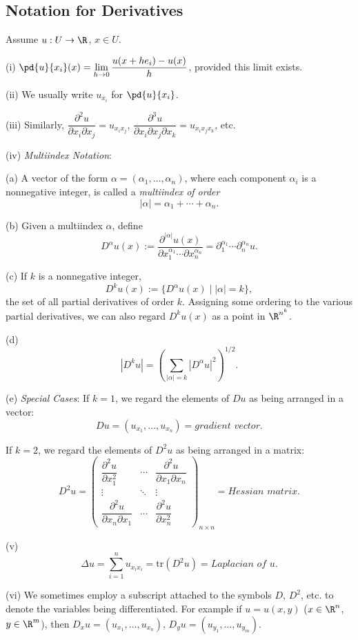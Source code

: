 \subsection{Notation for Derivatives}
\label{sec:notation-for-derivatives}

\begin{definition}
\label{def:derivative-notation-multiindex}
Assume $u : U \to \R$, $x \in U$.

(i) $\pd{u}{x_i}(x) = \lim\limits_{h \to 0} \dfrac{u(x+he_i)-u(x)}{h}$, provided this limit exists.

(ii) We usually write $u_{x_i}$ for $\pd{u}{x_i}$.

(iii) Similarly, $\dfrac{\partial^2 u}{\partial x_i \partial x_j} = u_{x_i x_j}$, $\dfrac{\partial^3 u}{\partial x_i \partial x_j \partial x_k} = u_{x_i x_j x_k}$, etc.

(iv) \textit{Multiindex Notation}:

(a) A vector of the form $\alpha = (\alpha_1, \ldots, \alpha_n)$, where each component $\alpha_i$ is a nonnegative integer, is called a \textit{multiindex of order}
$$|\alpha| = \alpha_1 + \cdots + \alpha_n.$$

(b) Given a multiindex $\alpha$, define
$$D^\alpha u(x) := \frac{\partial^{|\alpha|} u(x)}{\partial x_1^{\alpha_1} \cdots \partial x_n^{\alpha_n}} = \partial_1^{\alpha_1} \cdots \partial_n^{\alpha_n} u.$$

(c) If $k$ is a nonnegative integer,
$$D^k u(x) := \{D^\alpha u(x) \mid |\alpha| = k\},$$
the set of all partial derivatives of order $k$. Assigning some ordering to the various partial derivatives, we can also regard $D^k u(x)$ as a point in $\R^{n^k}$.

(d)
$$|D^k u| = \left(\sum_{|\alpha|=k} |D^\alpha u|^2\right)^{1/2}.$$

(e) \textit{Special Cases}: If $k = 1$, we regard the elements of $Du$ as being arranged in a vector:
$$Du = (u_{x_1}, \ldots, u_{x_n}) = \textit{gradient vector}.$$

If $k = 2$, we regard the elements of $D^2 u$ as being arranged in a matrix:
$$D^2 u = \begin{pmatrix}
\dfrac{\partial^2 u}{\partial x_1^2} & \cdots & \dfrac{\partial^2 u}{\partial x_1 \partial x_n} \\[1em]
\vdots & \ddots & \vdots \\[0.5em]
\dfrac{\partial^2 u}{\partial x_n \partial x_1} & \cdots & \dfrac{\partial^2 u}{\partial x_n^2}
\end{pmatrix}_{n \times n} = \textit{Hessian matrix}.$$

(v)
$$\Delta u = \sum_{i=1}^n u_{x_i x_i} = \text{tr}(D^2 u) = \textit{Laplacian of } u.$$

(vi) We sometimes employ a subscript attached to the symbols $D$, $D^2$, etc. to denote the variables being differentiated. For example if $u = u(x,y)$ ($x \in \R^n$, $y \in \R^m$), then $D_x u = (u_{x_1}, \ldots, u_{x_n})$, $D_y u = (u_{y_1}, \ldots, u_{y_m})$.
\end{definition}

